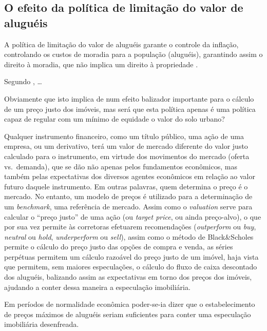 \documentclass[
	12pt,				%
	oneside,			%
	a4paper,			%
	chapter=TITLE,		%
	section=TITLE,		%
	english,			%
	brazil				%
	]{abntex2}
\begin{document}
\begin{refsection}
\hypertarget{o-efeito-da-poluxedtica-de-limitauxe7uxe3o-do-valor-de-aluguuxe9is}{%
\subsection{O efeito da política de limitação do valor de aluguéis}\label{o-efeito-da-poluxedtica-de-limitauxe7uxe3o-do-valor-de-aluguuxe9is}}

A política de limitação do valor de aluguéis garante o controle da inflação,
controlando os custos de moradia para a população (aluguéis), garantindo assim
o direito à moradia, que não implica um direito à propriedade \autocite{fnogueira}.

Segundo \textcite[p.~194-195]{shelter}, \ldots{}

Obviamente que isto implica de num efeito balizador importante para o cálculo de
um preço justo dos imóveis, mas será que esta política apenas é uma política
capaz de regular com um mínimo de equidade o valor do solo urbano?

Qualquer instrumento financeiro, como um título público, uma ação de uma
empresa, ou um derivativo, terá um valor de mercado diferente do valor justo
calculado para o instrumento, em virtude dos movimentos do mercado (oferta
vs.~demanda), que se dão não apenas pelos fundamentos econômicos, mas também pelas
expectativas dos diversos agentes econômicos em relação ao valor futuro daquele
instrumento. Em outras palavras, quem determina o preço é o mercado. No entanto,
um modelo de preços é utilizado para a determinação de um \emph{benchmark}, uma
referência de mercado. Assim como o \emph{valuation} serve para calcular o ``preço
justo'' de uma ação (ou \emph{target price}, ou ainda preço-alvo), o que por sua vez
permite às corretoras efetuarem recomendações (\emph{outperform} ou \emph{buy}, \emph{neutral}
ou \emph{hold}, \emph{underperform} ou \emph{sell}), assim como o método de Black\&Scholes
\autocite{marins2} permite o cálculo do preço justo das opções de compra e venda, as
séries perpétuas permitem um cálculo razoável do preço justo de um imóvel, haja
vista que permitem, sem maiores especulações, o cálculo do fluxo de caixa
descontado dos aluguéis, balizando assim as expectativas em torno dos preços dos
imóveis, ajudando a conter dessa maneira a especulação imobiliária.

Em períodos de normalidade econômica poder-se-ia dizer que o estabelecimento
de preços máximos de aluguéis seriam suficientes para conter uma especulação
imobiliária desenfreada.


\end{refsection}
\end{document}
